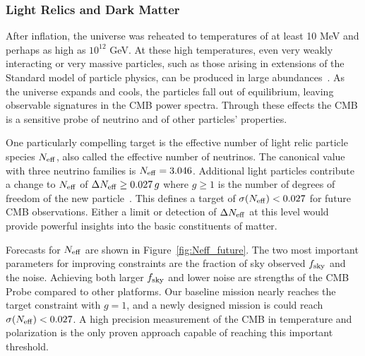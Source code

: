 \vspace{-0.15in}

\subsubsection{Light Relics and Dark Matter}

\vspace{-0.05in}

After inflation, the universe was reheated to temperatures of at least 10 MeV and perhaps as high as $10^{12}$ GeV.  
At these high temperatures, even very weakly interacting or very massive particles, such as those arising 
in extensions of the Standard model of particle physics, can be produced in large abundances~\cite{1979ARNPS..29..313S,Bolz:2000fu}.  As the universe expands and cools, 
the particles fall out of equilibrium, leaving observable signatures in the \ac{CMB} power spectra. 
Through these effects the CMB is a sensitive probe of neutrino and of other particles' properties.  

One particularly compelling target is the effective number of light relic particle species ${N_{\rm eff}}$, also called the effective 
number of neutrinos. The canonical value with three neutrino families is ${N_{\rm eff}} = 3.046$. Additional light particles 
contribute a change to ${N_{\rm eff}}$ of $\Delta {N_{\rm eff}} \geq 0.027\,g$ where $g \geq 1$ is the number of 
degrees of freedom of the new particle~\cite{Brust:2013xpv,Baumann:2016wac}.  
This defines a target of $\sigma({N_{\rm eff}}) < 0.027$ for future CMB observations. 
Either a limit or detection of $\Delta {N_{\rm eff}}$ at this level would provide powerful insights into the basic constituents 
of matter. 

Forecasts for ${N_{\rm eff}}$ are shown in Figure~\ref{fig:Neff_future}.  The two most important parameters for improving constraints
are the fraction of sky observed $f_{\rm sky}$ and the noise. Achieving both larger $f_{\rm sky}$ and
lower noise are strengths of the CMB Probe compared to other platforms. 
Our baseline mission nearly reaches the target constraint with $g=1$, and
a newly designed mission is could reach $\sigma({N_{\rm eff}}) < 0.027$.  A high precision measurement of the CMB in temperature and polarization is the only proven approach capable of reaching this important threshold.  

